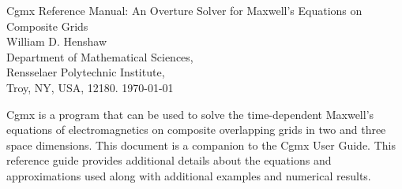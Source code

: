 \documentclass{article}
\begin{document}


\newlength{\ycbTop}%
\newlength{\ycbMid}%

\def\ud     {{    U}}
\def\pd     {{    P}}

\newcommand{\mbar}{\bar{m}}
\newcommand{\Rbar}{\bar{R}}
\newcommand{\Ru}{R_u}         %
\newcommand{\Div}{\grad\cdot}
\newcommand{\tauv}{\boldsymbol{\tau}}
\newcommand{\sumi}{\sum_{i=1}^n}
\newcommand{\dt}{{\Delta t}}
\newcommand{\dx}{{\Delta x}}
\newcommand{\eps}{\epsilon}

\newcommand{\Ic}{{\mathcal I}}
\newcommand{\Lc}{{\mathcal L}}
\newcommand{\Oc}{{\mathcal O}}

\baselineskip
\begin{flushleft}
{\Large
Cgmx Reference Manual: An {Overture} Solver for {Maxwell}'s Equations on Composite Grids\\
}
\vspace{2\baselineskip}
William D. Henshaw  \\
Department of Mathematical Sciences, \\
Rensselaer Polytechnic Institute, \\
Troy, NY, USA, 12180.
\vspace{\baselineskip}
\today\\
\vspace{\baselineskip}

\vspace{4\baselineskip}


Cgmx is a program that can be used to solve the time-dependent Maxwell's equations
of electromagnetics on composite overlapping grids in two and three space
dimensions. This document is a companion to the Cgmx User Guide. 
This reference guide provides additional details about the equations and approximations used along
with additional examples and numerical results.

\end{flushleft}
\end{document}

